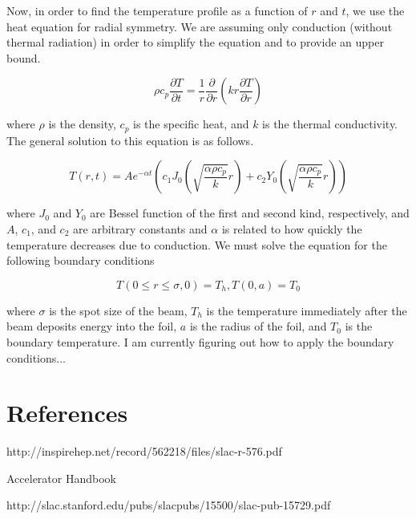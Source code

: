 \documentclass[12pt]{article}
\begin{document}
Now, in order to find the temperature profile as a function of $r$ and $t$, we use the heat equation for radial symmetry. We are assuming only conduction (without thermal radiation) in order to simplify the equation and to provide an upper bound.

\begin{equation}
\rho c_p \frac{\partial T}{\partial t}=\frac{1}{r} \frac{\partial}{\partial r} (k r \frac{\partial T}{\partial r})
\end{equation}

where $\rho$ is the density, $c_p$ is the specific heat, and $k$ is the thermal conductivity. The general solution to this equation is as follows.

\begin{equation}
T(r,t)=Ae^{-\alpha t} (c_1 J_0(\sqrt{\frac{\alpha \rho c_p}{k}}r)+c_2 Y_0(\sqrt{\frac{\alpha \rho c_p}{k}}r))
\end{equation}

where $J_0$ and $Y_0$ are Bessel function of the first and second kind, respectively, and $A$, $c_1$, and $c_2$ are arbitrary constants and $\alpha$ is related to how quickly the temperature decreases due to conduction. We must solve the equation for the following boundary conditions

\begin{equation}
T(0 \le r \le \sigma,0)=T_h, T(0,a)=T_0
\end{equation}

where $\sigma$ is the spot size of the beam, $T_h$ is the temperature immediately after the beam deposits energy into the foil, $a$ is the radius of the foil, and $T_0$ is the boundary temperature. I am currently figuring out how to apply the boundary conditions...

\section*{References}
\begin{enumerate}[{[}1{]}]
\item http://inspirehep.net/record/562218/files/slac-r-576.pdf
\item Accelerator Handbook
\item http://slac.stanford.edu/pubs/slacpubs/15500/slac-pub-15729.pdf

\end{enumerate}
\end{document}
